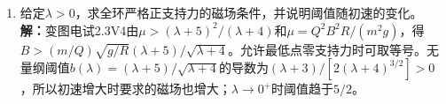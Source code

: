\documentclass[UTF8,fontset=fandol,a4paper,11pt]{ctexart}
\begin{document}
\begin{enumerate}
\item 给定$\lambda>0$，求全环严格正支持力的磁场条件，并说明阈值随初速的变化。
\textbf{解：}变图电试2.3V4由$\mu>(\lambda+5)^2/(\lambda+4)$和$\mu=Q^2B^2R/(m^2g)$，得$B>(m/Q)\sqrt{g/R}(\lambda+5)/\sqrt{\lambda+4}$。允许最低点零支持力时可取等号。无量纲阈值$b(\lambda)=(\lambda+5)/\sqrt{\lambda+4}$的导数为$(\lambda+3)/[2(\lambda+4)^{3/2}]>0$，所以初速增大时要求的磁场也增大；$\lambda\to0^+$时阈值趋于$5/2$。
\begin{center}\begin{minipage}{.98\linewidth}\centering
{}
\end{minipage}
\end{center}
\end{enumerate}
\end{document}
